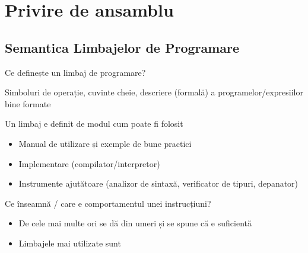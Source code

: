 \documentclass[xcolor=x11names,compress,10pt]{beamer}
\begin{document}





\section{Privire de ansamblu}  \sectionframe

\subsection{Semantica Limbajelor de Programare}\subsectionframe

\begin{frame}
{Ce definește un limbaj de programare?}
\begin{description}
\medskip\item[Sintaxa] Simboluri de operație, cuvinte cheie, descriere (formală) a programelor/expresiilor bine formate
\medskip\item[Practica] Un limbaj e definit de modul cum poate fi folosit
\begin{itemize}
\item Manual de utilizare și exemple de bune practici
\item Implementare (compilator/interpretor)
\item Instrumente ajutătoare (analizor de sintaxă, verificator de tipuri, depanator)
\end{itemize}  
\medskip\item[Semantica?] Ce înseamnă / care e comportamentul unei instrucțiuni?
\begin{itemize}
\item De cele mai multe ori se dă din umeri și se spune că  e suficientă 
\item Limbajele mai utilizate sunt 
\end{itemize}
\end{description}
\end{frame}
\end{document}
